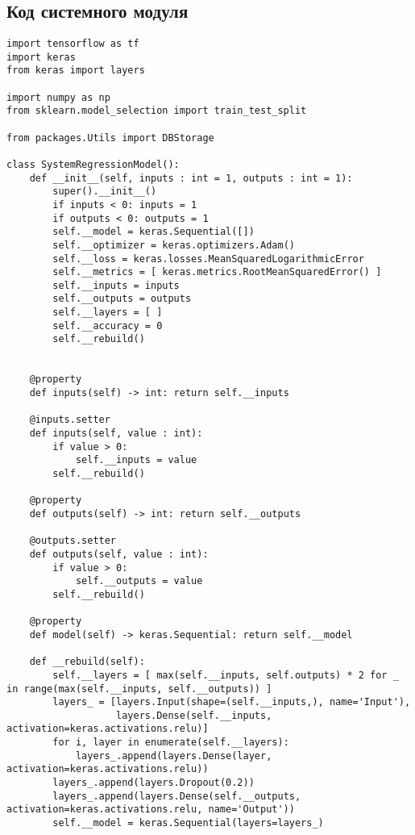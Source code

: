 \chapter{}

\section*{Код системного модуля}


\begin{verbatim}
import tensorflow as tf
import keras
from keras import layers

import numpy as np
from sklearn.model_selection import train_test_split

from packages.Utils import DBStorage

class SystemRegressionModel():
    def __init__(self, inputs : int = 1, outputs : int = 1):
        super().__init__()
        if inputs < 0: inputs = 1
        if outputs < 0: outputs = 1
        self.__model = keras.Sequential([])
        self.__optimizer = keras.optimizers.Adam()
        self.__loss = keras.losses.MeanSquaredLogarithmicError
        self.__metrics = [ keras.metrics.RootMeanSquaredError() ]
        self.__inputs = inputs
        self.__outputs = outputs
        self.__layers = [ ]
        self.__accuracy = 0
        self.__rebuild()


    @property
    def inputs(self) -> int: return self.__inputs
    
    @inputs.setter
    def inputs(self, value : int): 
        if value > 0: 
            self.__inputs = value
        self.__rebuild()
    
    @property
    def outputs(self) -> int: return self.__outputs
    
    @outputs.setter
    def outputs(self, value : int): 
        if value > 0: 
            self.__outputs = value
        self.__rebuild()
    
    @property
    def model(self) -> keras.Sequential: return self.__model
    
    def __rebuild(self):
        self.__layers = [ max(self.__inputs, self.outputs) * 2 for _ in range(max(self.__inputs, self.__outputs)) ]
        layers_ = [layers.Input(shape=(self.__inputs,), name='Input'), 
                   layers.Dense(self.__inputs, activation=keras.activations.relu)]
        for i, layer in enumerate(self.__layers):
            layers_.append(layers.Dense(layer, activation=keras.activations.relu))
        layers_.append(layers.Dropout(0.2))
        layers_.append(layers.Dense(self.__outputs, activation=keras.activations.relu, name='Output'))
        self.__model = keras.Sequential(layers=layers_)
        

\end{verbatim}
